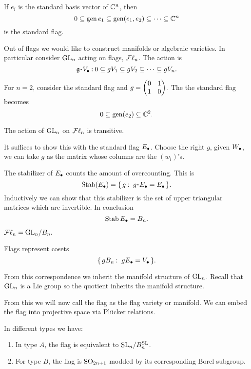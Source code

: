 \documentclass[12pt]{memoir}
\begin{document}
\begin{Ex}
    If $e_i$ is the standard basis vector of $\mathbb{C}^n$, then 
    $$0\subseteq\operatorname{gen}{e_1}\subseteq\operatorname{gen}(e_1,e_2)\subseteq\dots\subseteq\mathbb{C}^n$$
    is the standard flag.
\end{Ex}

Out of flags we would like to construct manifolds or algebraic varieties. In particular consider $\mathrm{GL}_n$ acting on flags, $\operatorname{\mathcal{F}\ell}_n$. The action is 
$$\g\. V_\8\: 0\subseteq gV_1\subseteq gV_2\subseteq\dots\subseteq gV_n.$$

\begin{Ex}
    For $n=2$, consider the standard flag and $g=\begin{pmatrix} 0 & 1 \\ 1 & 0 \end{pmatrix}$. The the standard flag becomes 
    $$0\subseteq\operatorname{gen}(e_2)\subseteq\mathbb{C}^2.$$
\end{Ex}

\begin{Lem}
    The action of $\mathrm{GL}_n$ on $\operatorname{\mathcal{F}\ell}_n$ is transitive.
\end{Lem}

\begin{ptcbp}
    It suffices to show this with the standard flag $E_\bullet$. Choose the right $g$, given $W_\bullet$, we can take $g$ as the matrix whose columns are the $(w_i)$'s.
\end{ptcbp}

\begin{Ex}
    The stabilizer of $E_\bullet$ counts the amount of overcounting. This is 
    $$\Stab(E_\8)=\set{g\:\ g\.E_\8=E_\8}.$$
    Inductively we can show that this stabilizer is the set of upper triangular matrices which are invertible. In conclusion 
    $$\operatorname{Stab} E_\bullet=B_n.$$
\end{Ex}

\begin{Th}
    $\operatorname{\mathcal{F}\ell}_n=\mathrm{GL}_n/B_n.$
\end{Th}

\begin{ptcbp}
    Flags represent cosets 
    $$\set{gB_n\:\ gE_\8=V_\8}.$$
\end{ptcbp}

From this correspondence we inherit the manifold structure of $\mathrm{GL}_n$. Recall that $\mathrm{GL}_n$ is a Lie group so the quotient inherits the manifold structure.\par
From this we will now call the flag as the flag variety or manifold. We can embed the flag into projective space via Plücker relations. 

\begin{Ex}
    In different types we have:
    \begin{enumerate}
\item In type $A$, the flag is equivalent to $\mathrm{SL}_n/B^{\mathrm{SL}}_n$. 
\item For type $B$, the flag is $\mathrm{SO}_{2n+1}$ modded by its corresponding Borel subgroup.
    \end{enumerate}
\end{Ex}
\end{document}
